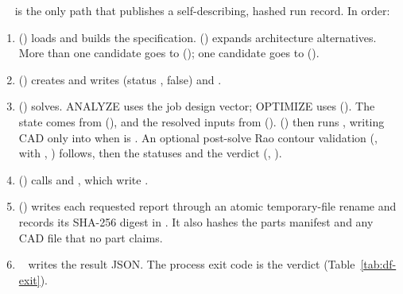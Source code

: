 ~~ is the only path that publishes a self-describing, hashed run record. In order:
\begin{enumerate}
  \item {} () loads and builds the specification.  () expands architecture alternatives. More than one candidate goes to  (); one candidate goes to  ().
  \item {} () creates  and writes  (status ,  false) and .
  \item {} () solves. ANALYZE uses the job design vector; OPTIMIZE uses  (). The state comes from  (), and the resolved inputs from  ().  () then runs , writing CAD only into  when  is . An optional post-solve Rao contour validation (, with , ) follows, then the statuses and the verdict (, ).
  \item {} () calls  and , which write .
  \item {} () writes each requested report through an atomic temporary-file rename and records its SHA-256 digest in . It also hashes the parts manifest and any CAD file that no part claims.
  \item {}~ writes the result JSON. The process exit code is the verdict (Table~\ref{tab:df-exit}).
\end{enumerate}

